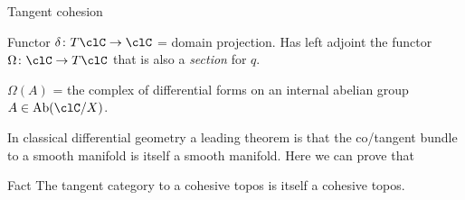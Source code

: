\documentclass[presentation,handout]{beamer}
\begin{document}
%
%
%
%
%
%
%
%
%
%
%
%
%
%
\begin{frame}{Tangent cohesion}
  \begin{prop}
    Functor $\delta\colon T\clC\to \clC$ = domain projection. Has left adjoint the functor $\Omega\colon \clC\to T\clC$ that is also a \emph{section} for $q$.
    
    \onslide<+->
    $\Omega(A)$ = the complex of \alert{differential forms} on an internal abelian group $A\in \text{Ab}(\clC/X)$.
  \end{prop}
  
  \onslide<+->
  \vspace*{\fill}
  In classical differential geometry a leading theorem is that the co/tangent bundle to a smooth manifold is  itself a smooth manifold. Here we can prove that
  
  \onslide<+->
  \vspace*{\fill}
  \begin{myblock}{Fact}
    The tangent category to a cohesive topos is itself a cohesive topos.
  \end{myblock}
\end{frame}
%
%
%
%
%
%
%
%
%
%
%
%
%
\end{document}
